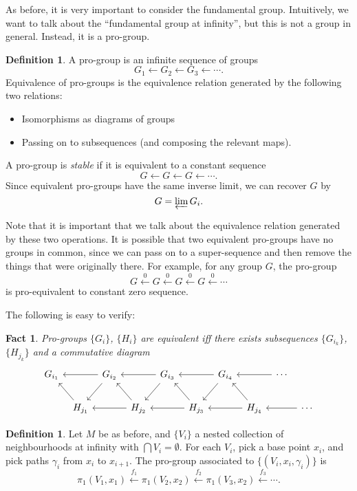 \documentclass[a4paper, 12pt]{article}
\newtheorem{fact}[thm]{Fact}
\theoremstyle{definition}
\newtheorem{defi}[thm]{Definition}
\begin{document}
As before, it is very important to consider the fundamental group. Intuitively, we want to talk about the ``fundamental group at infinity'', but this is not a group in general. Instead, it is a pro-group.
\begin{defi}
  A pro-group is an infinite sequence of groups
  \[
    G_1 \leftarrow G_2 \leftarrow G_3 \leftarrow \cdots.
  \]
  Equivalence of pro-groups is the equivalence relation generated by the following two relations:
  \begin{itemize}
    \item Isomorphisms as diagrams of groups
    \item Passing on to subsequences (and composing the relevant maps).
  \end{itemize}
  A pro-group is \emph{stable} if it is equivalent to a constant sequence
  \[
    G \leftarrow G \leftarrow G \leftarrow \cdots.
  \]
  Since equivalent pro-groups have the same inverse limit, we can recover $G$ by
  \[
    G = \varprojlim G_i.
  \]
\end{defi}
Note that it is important that we talk about the equivalence relation generated by these two operations. It is possible that two equivalent pro-groups have no groups in common, since we can pass on to a super-sequence and then remove the things that were originally there. For example, for any group $G$, the pro-group
\[
  G \overset{0}{\leftarrow} G \overset{0}{\leftarrow} G \overset{0}{\leftarrow} G \overset{0}{\leftarrow} \cdots
\]
is pro-equivalent to constant zero sequence.

The following is easy to verify:
\begin{fact}
  Pro-groups $\{G_i\}$, $\{H_i\}$ are equivalent iff there exists subsequences $\{G_{i_k}\}$, $\{H_{j_k}\}$ and a commutative diagram
  \[
    \begin{tikzcd}[column sep=tiny]
      G_{i_1} && G_{i_2} \ar[ll] \ar[ld] && G_{i_3} \ar[ll] \ar[ld] && G_{i_4} \ar[ll] \ar[ld] && \cdots \ar[ll]\\
      & H_{j_1} \ar[lu] && H_{j_2} \ar[ll] \ar[lu] && H_{j_3} \ar[ll] \ar[lu] && H_{j_4} \ar[ll] \ar[lu] && \cdots \ar[ll]
    \end{tikzcd}
  \]
\end{fact}

\begin{defi}
  Let $M$ be as before, and $\{V_i\}$ a nested collection of neighbourhoods at infinity with $\bigcap V_i = \emptyset$. For each $V_i$, pick a base point $x_i$, and pick paths $\gamma_i$ from $x_i$ to $x_{i + 1}$. The pro-group associated to $\{(V_i, x_i, \gamma_i)\}$ is
  \[
    \pi_1(V_1, x_1) \overset{f_1}\longleftarrow \pi_1(V_2, x_2) \overset{f_2}\longleftarrow \pi_1(V_3, x_2) \overset{f_3}\longleftarrow \cdots.
  \]
\end{defi}
\end{document}
